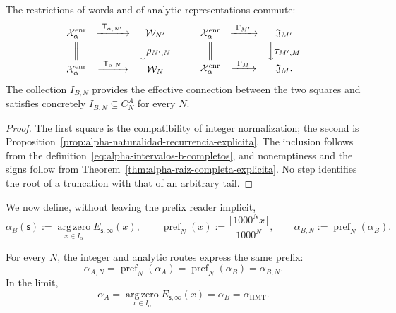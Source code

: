 \begin{proposition}
\label{prop:alpha-cuadrados-compatibilidad}
The restrictions of words and of analytic representations commute:
\[
\begin{array}{ccc}
 \mathcal X_\alpha^{\mathrm{enr}}&
 \xrightarrow{\ \mathsf T_{\alpha,N'}\ }&\mathcal W_{N'}\\[1mm]
 \Big\Vert&&\Big\downarrow\rho_{N',N}\\[1mm]
 \mathcal X_\alpha^{\mathrm{enr}}&
 \xrightarrow{\ \mathsf T_{\alpha,N}\ }&\mathcal W_N
\end{array}
\qquad
\begin{array}{ccc}
 \mathcal X_\alpha^{\mathrm{enr}}&
 \xrightarrow{\ \Gamma_{M'}\ }&\mathfrak J_{M'}\\[1mm]
 \Big\Vert&&\Big\downarrow\tau_{M',M}\\[1mm]
 \mathcal X_\alpha^{\mathrm{enr}}&
 \xrightarrow{\ \Gamma_M\ }&\mathfrak J_M .
\end{array}
\]
The collection \(I_{B,N}\) provides the effective connection between the two
squares and satisfies concretely
\(I_{B,N}\subseteq C_N^A\) for every \(N\).
\end{proposition}

\begin{proof}
The first square is the compatibility of integer normalization; the second
is Proposition~\ref{prop:alpha-naturalidad-recurrencia-explicita}. The
inclusion follows from the definition~\eqref{eq:alpha-intervalos-b-completos},
and nonemptiness and the signs follow from
Theorem~\ref{thm:alpha-raiz-completa-explicita}. No step identifies the
root of a truncation with that of an arbitrary tail.
\end{proof}

We now define, without leaving the prefix reader implicit,
\begin{equation}
 \alpha_B(\mathsf s):=
 \operatorname*{arg\,zero}_{x\in I_\alpha}E_{\mathsf s,\infty}(x),
 \qquad
 \operatorname{pref}_N(x):=
 \frac{\lfloor1000^Nx\rfloor}{1000^N},
 \qquad
 \alpha_{B,N}:=\operatorname{pref}_N(\alpha_B).
 \label{eq:alpha-definicion-b-y-prefijos-rev08}
\end{equation}

\begin{theorem}
\label{thm:alpha-dos-publicaciones-completas}
For every \(N\), the integer and analytic routes express the same prefix:
\begin{equation}
 \boxed{\alpha_{A,N}=\operatorname{pref}_N(\alpha_A)
 =\operatorname{pref}_N(\alpha_B)=\alpha_{B,N}.}
 \label{eq:alpha-dos-vias-cada-nivel}
\end{equation}
In the limit,
\begin{equation}
 \boxed{\alpha_A
 =\operatorname*{arg\,zero}_{x\in I_\alpha}
       E_{\mathsf s,\infty}(x)
 =\alpha_B=\alpha_{\mathrm{HMT}}.}
 \label{eq:alpha-dos-vias-limite-coinductivo}
\end{equation}
\end{theorem}

